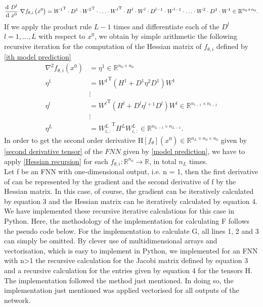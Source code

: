 \begin{equation*}
    \frac{\textup{d} \ D^{l}}{\textup{d} \ x^0} \  \nabla f_{\theta, i} \left(x^0\right) = {W^{1}}^{\mathrm{T}} \cdot D^{1} \cdot {W^{2}}^{\mathrm{T}} \cdot \ldots \cdot {W^{l}}^{\mathrm{T}} \cdot H^{l} \cdot W^l \cdot D^{l-1} \cdot W^{l-1} \cdot \ldots \cdot W^2 \cdot D^1 \cdot W^{1} \in \mathbb{R}^{n_{0} \times n_0}.
\end{equation*}
If we apply the product rule $L-1$ times and differentiate each of the $D^l$ $l = 1, \ldots, L$ with respect to $x^0$, we obtain by simple arithmetic the following recursive iteration for the computation of the Hessian matrix of $f_{\theta, i}$ defined by \cref{ith model prediction} 
\begin{equation}
    \label{Hessian recursion}
    \begin{aligned}
        \nabla^{2} f_{\theta, i} \left(x^0\right) & = \eta^{1} \in \mathbb{R}^{n_0 \times n_0} \\
        \eta^{1} & = {W^{1}}^{\mathrm{T}} \left( H^{1} + D^{1} \eta^{2} D^{1} \right) W^{1} \\
        & \vdots \\
        \eta^{l} & = {W^{l}}^{\mathrm{T}} \left( H^{l} + D^{l} \eta^{l+1} D^{l} \right) W^{l} \in \mathbb{R}^{n_{l-1} \times n_{l-1}} \\
        & \vdots \\
        \eta^{L} & = {W^L_{i,:}}^{\mathrm{T}} H^{L} W^L_{i,:} \in \mathbb{R}^{n_{L-1} \times n_{L-1}}.
    \end{aligned}
\end{equation}
In order to get the second order derivative $\mathrm{H} \left[f_{\theta} \right]\left(x^0\right) \in \mathbb{R}^{n_L \times n_0 \times n_0}$ given by \cref{second derivative tensor} of the $FNN$ given by \cref{model prediction}, we have to apply \cref{Hessian recursion} for each $f_{\theta, i} \colon \mathbb{R}^{n_0} \to \mathbb{R}$, in total $n_L$ times.  \\


Let f be an FNN with one-dimensional output, i.e. n = 1, then the first derivative of can be represented by the gradient and the second derivative of f by the Hessian matrix. In this case, of course, the gradient can be iteratively calculated by equation 3 and the Hessian matrix can be iteratively calculated by equation 4. We have implemented these recursive iterative calculations for this case in Python. Here, the methodology of the implementation for calculating F follows the pseudo code below. For the implementation to calculate G, all lines 1, 2 and 3 can simply be omitted. By clever use of multidimensional arrays and vectorisation, which is easy to implement in Python, we implemented for an FNN with n>1 the recursive calculation for the Jacobi matrix defined by equation 3 and a recursive calculation for the entries given by equation 4 for the tensors H. The implementation followed the method just mentioned. In doing so, the implementation just mentioned was applied vectorised for all outputs of the network. 

